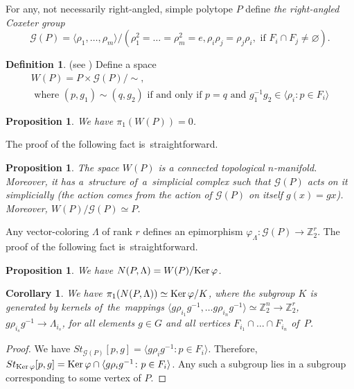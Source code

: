 \documentclass[12pt]{amsart}
\newtheorem{proposition}[formula]{Proposition}
\newtheorem{corollary}[formula]{Corollary}
\theoremstyle{definition}
\newtheorem{definition}[formula]{Definition}
\theoremstyle{remark}
\begin{document}
For any, not necessarily right-angled, simple polytope $P$ define 
{\it the right-angled Coxeter group} 
$$
\mathcal{G}(P)=\langle \rho_1,\dots,\rho_m\rangle/(\rho_1^2=\dots=\rho_m^2=e, \rho_i\rho_j=\rho_j\rho_i,
\text{ if }F_i\cap F_j\ne\varnothing).
$$
\begin{definition}(see \cite{V71, D83, D08})%
Define a space
\begin{gather*}
W(P)=P\times \mathcal{G}(P)/\sim,\\
\text{ where }(p,g_1)\sim(q,g_2)\text{ if and only if }p=q \text{ and }g_1^{-1}g_2\in
\langle \rho_i\colon p\in F_i\rangle
 \end{gather*}
\end{definition}
\begin{proposition}\cite[Theorems 10.1 and 13.5]{D83}
We have $\pi_1(W(P))=0$.  
\end{proposition}
The proof of the following fact is~straightforward.
\begin{proposition}
The space $W(P)$ is a connected topological $n$-manifold. Moreover, it has 
a~structure of~a~simplicial complex such that $\mathcal{G}(P)$ acts on it simplicially 
(the action comes from the  action of $\mathcal{G}(P)$ on itself $g(x)=gx$).
Moreover, $W(P)/\mathcal{G}(P)\simeq P$. 
\end{proposition}
Any vector-coloring $\Lambda$ of rank $r$ defines an epimorphism $\varphi_{\Lambda}\colon \mathcal{G}(P)\to \mathbb Z_2^r$.
The proof of the following fact is~straightforward.
\begin{proposition}
We have $N(P,\Lambda)=W(P)/{{\rm Ker\,} \varphi}$.
\end{proposition}
\begin{corollary}
We have $\pi_1(N(P,\Lambda))\simeq {{\rm Ker\,} \varphi}/K$, where the subgroup $K$ is generated by 
kernels of~the~mappings $\langle g\rho_{i_1}g^{-1},\dots g\rho_{i_n}g^{-1}\rangle\simeq\mathbb Z_2^n\to\mathbb Z_2^r$, 
$g\rho_{i_s}g^{-1}\to \Lambda_{i_s}$, for all elements $g\in G$ and all vertices $F_{i_1}\cap\dots\cap F_{i_n}$ of~$P$.
\end{corollary}
\begin{proof}
We have $St_{\mathcal{G}(P)}[p,g]=\langle g\rho_ig^{-1}\colon p\in F_i\rangle$. Therefore, 
$St_{{\rm Ker\,} \varphi}[p,g]={{\rm Ker\,} \varphi}\cap \langle g\rho_ig^{-1}\colon p\in F_i\rangle$. Any such a subgroup 
lies in a subgroup corresponding to some vertex of $P$.
\end{proof}
\end{document}
